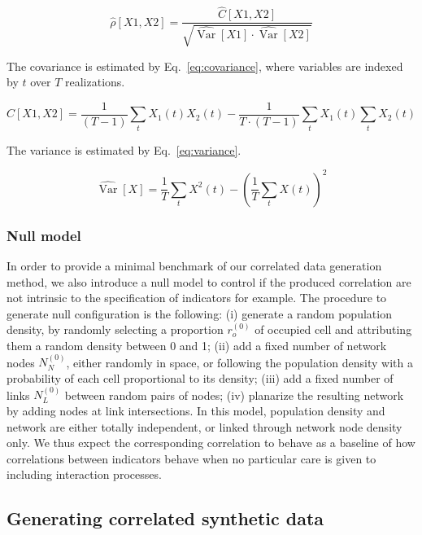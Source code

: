 \documentclass{article}
\DeclareMathOperator{\Var}{Var}
\begin{document}
\begin{equation}
\label{eq:correstimate}
\hat{\rho}[X1,X2] = \frac{\hat{C}[X1,X2]}{\sqrt{\hat{\Var{}}[X1] \cdot \hat{\Var{}}[X2]}}
\end{equation}

The covariance is estimated by Eq.~\ref{eq:covariance}, where variables are indexed by $t$ over $T$ realizations.

\begin{equation}
\label{eq:covariance}
\hat{C}[X1,X2] = \frac{1}{(T-1)}\sum_{t} X_1(t)X_2(t) - \frac{1}{T\cdot (T-1)} \sum_t X_1(t) \sum_t X_2(t)
\end{equation}

The variance is estimated by Eq.~\ref{eq:variance}.

\begin{equation}
\label{eq:variance}
\hat{\Var{}}[X] = \frac{1}{T}\sum_t{X^2(t)}-\left(\frac{1}{T}\sum_tX(t)\right)^2
\end{equation}

 


\subsubsection*{Null model}

In order to provide a minimal benchmark of our correlated data generation method, we also introduce a null model to control if the produced correlation are not intrinsic to the specification of indicators for example. The procedure to generate null configuration is the following: (i) generate a random population density, by randomly selecting a proportion $r_o^{(0)}$ of occupied cell and attributing them a random density between 0 and 1; (ii) add a fixed number of network nodes $N_N^{(0)}$, either randomly in space, or following the population density with a probability of each cell proportional to its density; (iii) add a fixed number of links $N_L^{(0)}$ between random pairs of nodes; (iv) planarize the resulting network by adding nodes at link intersections. In this model, population density and network are either totally independent, or linked through network node density only. We thus expect the corresponding correlation to behave as a baseline of how correlations between indicators behave when no particular care is given to including interaction processes.



\subsection*{Generating correlated synthetic data}
\end{document}
